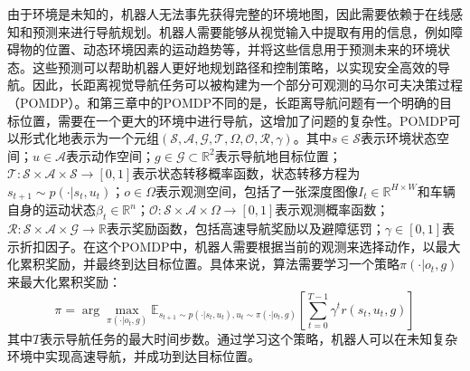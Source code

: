 由于环境是未知的，机器人无法事先获得完整的环境地图，因此需要依赖于在线感知和预测来进行导航规划。机器人需要能够从视觉输入中提取有用的信息，例如障碍物的位置、动态环境因素的运动趋势等，并将这些信息用于预测未来的环境状态。这些预测可以帮助机器人更好地规划路径和控制策略，以实现安全高效的导航。因此，长距离视觉导航任务可以被构建为一个部分可观测的马尔可夫决策过程（POMDP）。和第三章中的POMDP不同的是，长距离导航问题有一个明确的目标位置，需要在一个更大的环境中进行导航，这增加了问题的复杂性。POMDP可以形式化地表示为一个元组$(\mathcal{S}, \mathcal{A}, \mathcal{G}, \mathcal{T}, \Omega, \mathcal{O},  \mathcal{R}, \gamma)$。其中$s\in\mathcal{S}$表示环境状态空间；$u\in\mathcal{A}$表示动作空间；$g\in\mathcal{G}\subset \mathbb{R}^2$表示导航地目标位置；$\mathcal{T}: \mathcal{S} \times \mathcal{A} \times \mathcal{S} \rightarrow [0,1]$表示状态转移概率函数，状态转移方程为$s_{t+1} \sim p(\cdot \vert s_t, u_t)$；$o\in\Omega$表示观测空间，包括了一张深度图像$I_t\in\mathbb{R}^{H\times W}$和车辆自身的运动状态$\beta_t\in\mathbb{R}^n$；$\mathcal{O}: \mathcal{S} \times \mathcal{A} \times \Omega \rightarrow [0,1]$表示观测概率函数；$\mathcal{R}: \mathcal{S} \times \mathcal{A} \times \mathcal{G} \rightarrow \mathbb{R}$表示奖励函数，包括高速导航奖励以及避障惩罚；$\gamma\in[0,1]$表示折扣因子。在这个POMDP中，机器人需要根据当前的观测来选择动作，以最大化累积奖励，并最终到达目标位置。具体来说，算法需要学习一个策略$\pi(\cdot \vert o_t, g)$来最大化累积奖励：
\begin{equation}
    \pi = \arg\max_{\pi(\cdot \vert o_t, g)} \mathbb{E}_{s_{t+1} \sim p(\cdot \vert s_t, u_t), u_t \sim \pi(\cdot \vert o_t, g)} \left[ \sum_{t=0}^{T-1} \gamma^t r(s_t, u_t, g) \right]
\end{equation}
其中$T$表示导航任务的最大时间步数。通过学习这个策略，机器人可以在未知复杂环境中实现高速导航，并成功到达目标位置。

